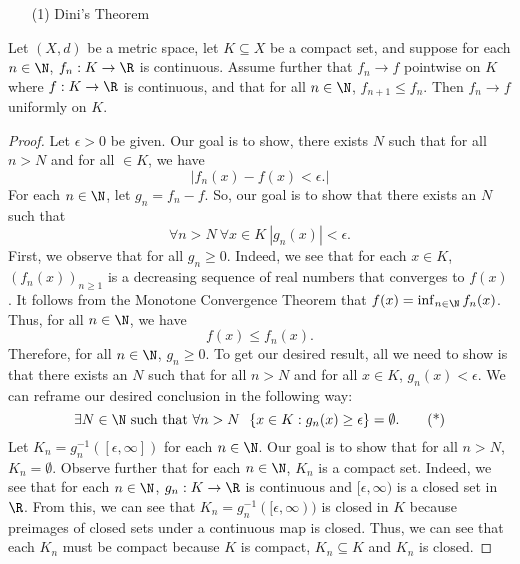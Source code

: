 \begin{enumerate}
    \item[(1)] Dini's Theorem
\end{enumerate}

\begin{theorem}[Rudin 7.13]
    Let \( (X,d) \) be a metric space, let \( K \subseteq  X   \) be a compact set, and suppose for each \( n \in \N  \), \( {f}_{n} : K \to \R  \) is continuous. Assume further that \( {f}_{n} \to f  \) pointwise on \( K  \) where \( f : K \to \R  \) is continuous, and that for all \( n \in \N  \), \( {f}_{n+1} \leq {f}_{n} \). Then \( {f}_{n} \to f  \) uniformly on \( K  \). 
\end{theorem}

\begin{proof}
Let \( \epsilon > 0 \) be given. Our goal is to show, there exists \( N  \) such that for all \( n > N  \) and for all \(  \in K  \), we have 
\[  | {f}_{n}(x) - f(x) < \epsilon. |  \]
For each \( n \in \N  \), let \( {g}_{n} = {f}_{n} - f  \). So, our goal is to show that there exists an \( N  \) such that 
\[  \forall n > N \ \forall x \in K \ | {g}_{n}(x) |  < \epsilon. \]
First, we observe that for all \( {g}_{n} \geq 0  \). Indeed, we see that for each \( x \in K  \), \( ({f}_{n}(x))_{n \geq 1 } \) is a decreasing sequence of real numbers that converges to \( f(x) \). It follows from the Monotone Convergence Theorem that \( f(x) = \inf_{n \in \N} {f}_{n}(x) \). Thus, for all \( n \in \N  \), we have
\[  f(x) \leq {f}_{n}(x). \]
Therefore, for all \( n \in \N  \), \( {g}_{n} \geq  0  \). To get our desired result, all we need to show is that there exists an \( N  \) such that for all \( n > N  \) and for all \( x \in K  \), \( {g}_{n}(x) < \epsilon \). We can reframe our desired conclusion in the following way: 
\[  \exists N \in \N \ \text{such that} \ \forall n > N \ \ \{ x \in K : {g}_{n}(x) \geq \epsilon  \}  = \emptyset. \tag{*} \] Let \( {K}_{n} = {g}_{n}^{-1}([\epsilon, \infty ]) \) for each \( n \in \N  \). Our goal is to show that for all \(  n > N  \), \( {K}_{n} = \emptyset \). Observe further that for each \( n \in \N  \), \( {K}_{n} \) is a compact set. Indeed, we see that for each \( n \in \N  \), \( {g}_{n} : K \to \R  \) is continuous and \( [\epsilon, \infty) \) is a closed set in \( \R  \). From this, we can see that \( {K}_{n} = {g}_{n}^{-1}([\epsilon,\infty) )  \) is closed in \( K  \) because preimages of closed sets under a continuous map is closed. Thus, we can see that each \( {K}_{n} \) must be compact because \( K  \) is compact, \( {K}_{n} \subseteq  K \)  and \( {K}_{n}  \) is closed. 


\end{proof}
